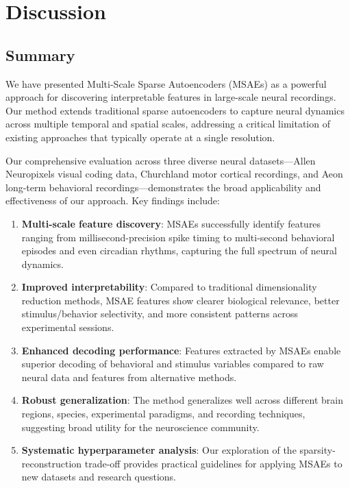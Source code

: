 \section{Discussion}

\subsection{Summary}

We have presented Multi-Scale Sparse Autoencoders (MSAEs) as a powerful approach for discovering interpretable features in large-scale neural recordings. Our method extends traditional sparse autoencoders to capture neural dynamics across multiple temporal and spatial scales, addressing a critical limitation of existing approaches that typically operate at a single resolution.

Our comprehensive evaluation across three diverse neural datasets—Allen Neuropixels visual coding data, Churchland motor cortical recordings, and Aeon long-term behavioral recordings—demonstrates the broad applicability and effectiveness of our approach. Key findings include:

\begin{enumerate}
\item \textbf{Multi-scale feature discovery}: MSAEs successfully identify features ranging from millisecond-precision spike timing to multi-second behavioral episodes and even circadian rhythms, capturing the full spectrum of neural dynamics.

\item \textbf{Improved interpretability}: Compared to traditional dimensionality reduction methods, MSAE features show clearer biological relevance, better stimulus/behavior selectivity, and more consistent patterns across experimental sessions.

\item \textbf{Enhanced decoding performance}: Features extracted by MSAEs enable superior decoding of behavioral and stimulus variables compared to raw neural data and features from alternative methods.

\item \textbf{Robust generalization}: The method generalizes well across different brain regions, species, experimental paradigms, and recording techniques, suggesting broad utility for the neuroscience community.

\item \textbf{Systematic hyperparameter analysis}: Our exploration of the sparsity-reconstruction trade-off provides practical guidelines for applying MSAEs to new datasets and research questions.
\end{enumerate}

